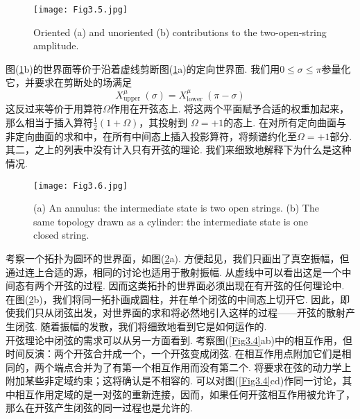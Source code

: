 \begin{figure}
	\begin{center}
		\texttt{[image: Fig3.5.jpg]}\\
\caption{Oriented (a) and unoriented (b) contributions to the two-open-string amplitude.}\label{Fig3.5}
	\end{center}
\end{figure}
图(\ref{Fig3.5}b)的世界面等价于沿着虚线剪断图(\ref{Fig3.5}a)的定向世界面. 我们用$0 \leq \sigma \leq \pi$参量化它，并要求在剪断处的场满足
\begin{equation}
X_{\text {upper }}^{\mu}(\sigma)=X_{\text {lower }}^{\mu}(\pi-\sigma)
\end{equation}
这反过来等价于用算符$\Omega$作用在开弦态上. 将这两个平面赋予合适的权重加起来，那么相当于插入算符$\frac{1}{2}(1+\Omega)$，其投射到
$\Omega=+1$的态上. 在对所有定向曲面与非定向曲面的求和中，在所有中间态上插入投影算符，将频谱约化至$\Omega=+1$部分.\\
其二，之上的列表中没有计入只有开弦的理论. 我们来细致地解释下为什么是这种情况.\\
\begin{figure}
	\begin{center}
		\texttt{[image: Fig3.6.jpg]}\\
\caption{(a) An annulus: the intermediate state is two open strings. (b) The same topology drawn as a cylinder: the intermediate state is one closed string.}\label{Fig3.6}
	\end{center}
\end{figure}
考察一个拓扑为圆环的世界面，如图(\ref{Fig3.6}a). 方便起见，我们只画出了真空振幅，但通过连上合适的源，相同的讨论也适用于散射振幅. 从虚线中可以看出这是一个中间态有两个开弦的过程. 因而这类拓扑的世界面必须出现在有开弦的任何理论中. 在图(\ref{Fig3.6}b)，我们将同一拓扑画成圆柱，并在单个闭弦的中间态上切开它. 因此，即使我们只从闭弦出发，对世界面的求和将必然地引入这样的过程——开弦的散射产生闭弦. 随着振幅的发散，我们将细致地看到它是如何运作的.\\
开弦理论中闭弦的需求可以从另一方面看到. 考察图(\ref{Fig3.4}ab)中的相互作用，但时间反演：两个开弦合并成一个，一个开弦变成闭弦. 在相互作用点附加它们是相同的，两个端点合并为了有第一个相互作用而没有第二个. 将要求在弦的动力学上附加某些非定域约束；这将确认是不相容的. 可以对图(\ref{Fig3.4}cd)作同一讨论，其中相互作用定域的是一对弦的重新连接，因而，如果任何开弦相互作用被允许了，那么在开弦产生闭弦的同一过程也是允许的.

